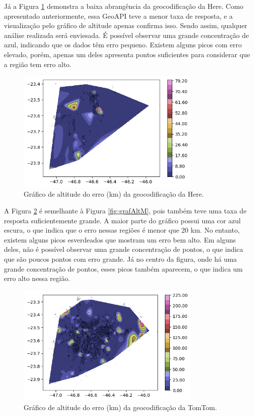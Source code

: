 Já a Figura \ref{fig:grafAltH} demonstra a baixa abrangência da geocodificação da Here. Como apresentado anteriormente, essa GeoAPI teve a menor taxa de resposta, e a visualização pelo gráfico de altitude apenas confirma isso. Sendo assim, qualquer análise realizada será enviesada. É possível observar uma grande concentração de azul, indicando que os dados têm erro pequeno. Existem alguns picos com erro elevado, porém, apenas um deles apresenta pontos suficientes para considerar que a região tem erro alto.


\begin{figure}[h]
  \centering
  \includegraphics[width=0.8\textwidth]{Figuras/graficoAltPontosHere.png}
  \caption{Gráfico de altitude do erro (km) da geocodificação da Here.}
  \label{fig:grafAltH}
\end{figure}

A Figura \ref{fig:grafAltT} é semelhante à Figura \ref{fig:grafAltM}, pois também teve uma taxa de resposta suficientemente grande. A maior parte do gráfico possui uma cor azul escura, o que indica que o erro nessas regiões é menor que 20 km. No entanto, existem alguns picos esverdeados que mostram um erro bem alto. Em alguns deles, não é possível observar uma grande concentração de pontos, o que indica que são poucos pontos com erro grande. Já no centro da figura, onde há uma grande concentração de pontos, esses picos também aparecem, o que indica um erro alto nessa região.

\begin{figure}[h]
  \centering
  \includegraphics[width=0.8\textwidth]{Figuras/graficoAltPontosTomtom.png}
  \caption{Gráfico de altitude do erro (km) da geocodificação da TomTom.}
  \label{fig:grafAltT}
\end{figure}

